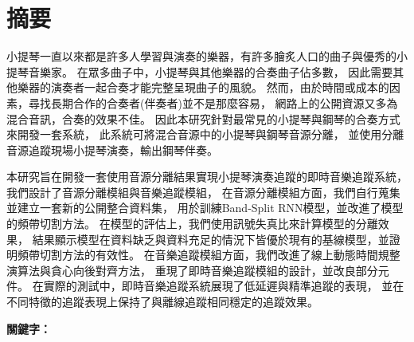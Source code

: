 \documentclass[class=NCU_thesis, crop=false]{standalone}
\begin{document}
\chapter{摘要}
小提琴一直以來都是許多人學習與演奏的樂器，有許多膾炙人口的曲子與優秀的小提琴音樂家。
在眾多曲子中，小提琴與其他樂器的合奏曲子佔多數，
因此需要其他樂器的演奏者一起合奏才能完整呈現曲子的風貌。
然而，由於時間或成本的因素，尋找長期合作的合奏者(伴奏者)並不是那麼容易，
網路上的公開資源又多為混合音訊，合奏的效果不佳。
因此本研究針對最常見的小提琴與鋼琴的合奏方式來開發一套系統，
此系統可將混合音源中的小提琴與鋼琴音源分離，
並使用分離音源追蹤現場小提琴演奏，輸出鋼琴伴奏。

本研究旨在開發一套使用音源分離結果實現小提琴演奏追蹤的即時音樂追蹤系統，
我們設計了音源分離模組與音樂追蹤模組，
在音源分離模組方面，我們自行蒐集並建立一套新的公開整合資料集，
用於訓練Band-Split RNN模型，並改進了模型的頻帶切割方法。
在模型的評估上，我們使用訊號失真比來計算模型的分離效果，
結果顯示模型在資料缺乏與資料充足的情況下皆優於現有的基線模型，並證明頻帶切割方法的有效性。
在音樂追蹤模組方面，我們改進了線上動態時間規整演算法與貪心向後對齊方法，
重現了即時音樂追蹤模組的設計，並改良部分元件。
在實際的測試中，即時音樂追蹤系統展現了低延遲與精準追蹤的表現，
並在不同特徵的追蹤表現上保持了與離線追蹤相同穩定的追蹤效果。

\vspace{2em}
\noindent \textbf{關鍵字：} \keywordsZh{} %
\end{document}
